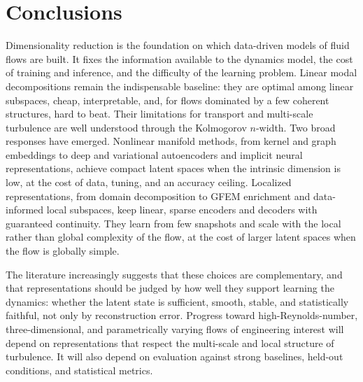\section{Conclusions}
\label{sec:conclusions}

Dimensionality reduction is the foundation on which data-driven models of
fluid flows are built. It fixes the information available to the dynamics
model, the cost of training and inference, and the difficulty of the learning
problem. Linear modal decompositions remain the indispensable baseline: they are
optimal among linear subspaces, cheap, interpretable, and, for flows dominated
by a few coherent structures, hard to beat. Their limitations for transport and
multi-scale turbulence are well understood through the Kolmogorov $n$-width.
Two broad responses have emerged. Nonlinear manifold methods, from kernel and
graph embeddings to deep and variational autoencoders and implicit neural
representations, achieve compact latent spaces when the intrinsic dimension is
low, at the cost of data, tuning, and an accuracy ceiling. Localized
representations, from domain decomposition to GFEM enrichment and data-informed
local subspaces, keep linear, sparse encoders and decoders with guaranteed
continuity. They learn from few snapshots and scale with the local rather than
global complexity of the flow, at the cost of larger latent spaces when the
flow is globally simple.

The literature increasingly suggests that these choices are complementary,
and that representations should be judged by how well they support learning
the dynamics: whether the latent state is sufficient, smooth, stable, and
statistically faithful, not only by reconstruction error. Progress toward
high-Reynolds-number, three-dimensional, and parametrically varying flows of
engineering interest will depend on representations that respect the
multi-scale and local structure of turbulence. It will also depend on
evaluation against strong baselines, held-out conditions, and statistical
metrics.
